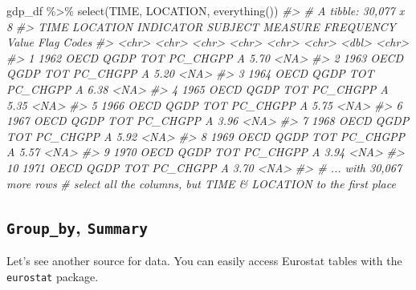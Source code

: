 \documentclass[
]{article}
\newenvironment{Shaded}{\begin{snugshade}}{\end{snugshade}}
\newcommand{\CommentTok}[1]{\textcolor[rgb]{0.56,0.35,0.01}{\textit{#1}}}
\newcommand{\FunctionTok}[1]{\textcolor[rgb]{0.00,0.00,0.00}{#1}}
\newcommand{\NormalTok}[1]{#1}
\newcommand{\SpecialCharTok}[1]{\textcolor[rgb]{0.00,0.00,0.00}{#1}}
\begin{document}
\begin{Shaded}
\begin{Highlighting}[]
\NormalTok{gdp\_df }\SpecialCharTok{\%\textgreater{}\%} 
  \FunctionTok{select}\NormalTok{(TIME, LOCATION, }\FunctionTok{everything}\NormalTok{()) }
\CommentTok{\#\textgreater{} \# A tibble: 30,077 x 8}
\CommentTok{\#\textgreater{}    TIME  LOCATION INDICATOR SUBJECT MEASURE  FREQUENCY Value \textasciigrave{}Flag Codes\textasciigrave{}}
\CommentTok{\#\textgreater{}    \textless{}chr\textgreater{} \textless{}chr\textgreater{}    \textless{}chr\textgreater{}     \textless{}chr\textgreater{}   \textless{}chr\textgreater{}    \textless{}chr\textgreater{}     \textless{}dbl\textgreater{} \textless{}chr\textgreater{}       }
\CommentTok{\#\textgreater{}  1 1962  OECD     QGDP      TOT     PC\_CHGPP A          5.70 \textless{}NA\textgreater{}        }
\CommentTok{\#\textgreater{}  2 1963  OECD     QGDP      TOT     PC\_CHGPP A          5.20 \textless{}NA\textgreater{}        }
\CommentTok{\#\textgreater{}  3 1964  OECD     QGDP      TOT     PC\_CHGPP A          6.38 \textless{}NA\textgreater{}        }
\CommentTok{\#\textgreater{}  4 1965  OECD     QGDP      TOT     PC\_CHGPP A          5.35 \textless{}NA\textgreater{}        }
\CommentTok{\#\textgreater{}  5 1966  OECD     QGDP      TOT     PC\_CHGPP A          5.75 \textless{}NA\textgreater{}        }
\CommentTok{\#\textgreater{}  6 1967  OECD     QGDP      TOT     PC\_CHGPP A          3.96 \textless{}NA\textgreater{}        }
\CommentTok{\#\textgreater{}  7 1968  OECD     QGDP      TOT     PC\_CHGPP A          5.92 \textless{}NA\textgreater{}        }
\CommentTok{\#\textgreater{}  8 1969  OECD     QGDP      TOT     PC\_CHGPP A          5.57 \textless{}NA\textgreater{}        }
\CommentTok{\#\textgreater{}  9 1970  OECD     QGDP      TOT     PC\_CHGPP A          3.94 \textless{}NA\textgreater{}        }
\CommentTok{\#\textgreater{} 10 1971  OECD     QGDP      TOT     PC\_CHGPP A          3.70 \textless{}NA\textgreater{}        }
\CommentTok{\#\textgreater{} \# ... with 30,067 more rows}
  \CommentTok{\# select all the columns, but TIME \& LOCATION to the first place}
\end{Highlighting}
\end{Shaded}

\hypertarget{group_by-summary}{%
\subsection{\texorpdfstring{\texttt{Group\_by}, \texttt{Summary}}{Group\_by, Summary}}\label{group_by-summary}}

Let's see another source for data. You can easily access Eurostat tables with the \texttt{eurostat} package.
\end{document}
